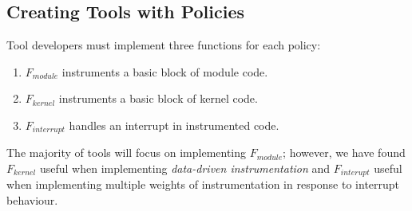 \documentclass[letterpaper,twocolumn,10pt]{article}
\begin{document}
%	
%	
%	
%	

\subsection{Creating Tools with Policies}

Tool developers must implement three functions for each policy: \begin{enumerate}
	\item $F_{module}$ instruments a basic block of module code.
	\item $F_{kernel}$ instruments a basic block of kernel code.
	\item $F_{interrupt}$ handles an interrupt in instrumented code.
\end{enumerate}

The majority of tools will focus on implementing $F_{module}$; however, we have found $F_{kernel}$ useful when implementing \emph{data-driven instrumentation} and $F_{interupt}$ useful when implementing multiple weights of instrumentation in response to interrupt behaviour. 
\end{document}
